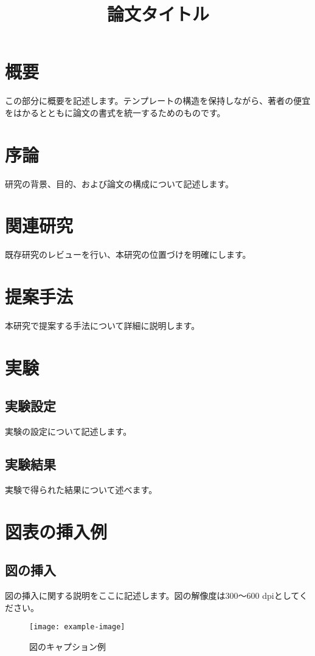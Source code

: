 \documentclass[10.5pt,twocolumn]{ltjsarticle}
\title{論文タイトル}
\begin{document}
\maketitle

\section{概要}
この部分に概要を記述します。テンプレートの構造を保持しながら、著者の便宜をはかるとともに論文の書式を統一するためのものです。

\section{序論}
研究の背景、目的、および論文の構成について記述します。

\section{関連研究}
既存研究のレビューを行い、本研究の位置づけを明確にします。

\section{提案手法}
本研究で提案する手法について詳細に説明します。

\section{実験}
\subsection{実験設定}
実験の設定について記述します。

\subsection{実験結果}
実験で得られた結果について述べます。

\section{図表の挿入例}
\subsection{図の挿入}
図の挿入に関する説明をここに記述します。図の解像度は300〜600 dpiとしてください。

\begin{figure}[H]
\centering
\texttt{[image: example-image]}
\caption{図のキャプション例}
\label{fig:example}
\end{figure}
\end{document}
